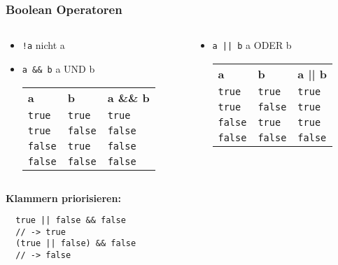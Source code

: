 \documentclass{../../presentation}
\begin{document}
\begin{frame}[fragile]
  \frametitle{Boolean Operatoren}
  \pause
  \begin{columns}
    \begin{column}{0.5\textwidth}
      \begin{itemize}
        \item \texttt{!a} \quad \textrightarrow \quad nicht a
              \pause
        \item \texttt{a \&\& b} \quad \textrightarrow \quad a UND b\\[0.3em]
              \pause
              {
                \begin{tabular}{l l l}
                  \rowcolor{tablehead}
                  \textbf{a}     & \textbf{b}     & \textbf{a \&\& b} \\
                  \texttt{true}  & \texttt{true}  & \texttt{true}     \\
                  \texttt{true}  & \texttt{false} & \texttt{false}    \\
                  \texttt{false} & \texttt{true}  & \texttt{false}    \\
                  \texttt{false} & \texttt{false} & \texttt{false}    \\
                \end{tabular}
              }
      \end{itemize}
    \end{column}

    \begin{column}{0.5\textwidth}
      \newline
      \pause
      \begin{itemize}
        \item \texttt{a || b} \quad \textrightarrow \quad a ODER b\\[0.3em]
              \pause
              {
                \begin{tabular}{l l l}
                  \rowcolor{tablehead}
                  \textbf{a}     & \textbf{b}     & \textbf{a || b} \\
                  \texttt{true}  & \texttt{true}  & \texttt{true}   \\
                  \texttt{true}  & \texttt{false} & \texttt{true}   \\
                  \texttt{false} & \texttt{true}  & \texttt{true}   \\
                  \texttt{false} & \texttt{false} & \texttt{false}  \\
                \end{tabular}
              }
      \end{itemize}
    \end{column}
  \end{columns}
  \vspace{0.5cm}
  \pause
  \textbf{Klammern priorisieren:}
  \begin{verbatim}
  true || false && false 
  // -> true
  (true || false) && false
  // -> false
  \end{verbatim}
\end{frame}
\end{document}
